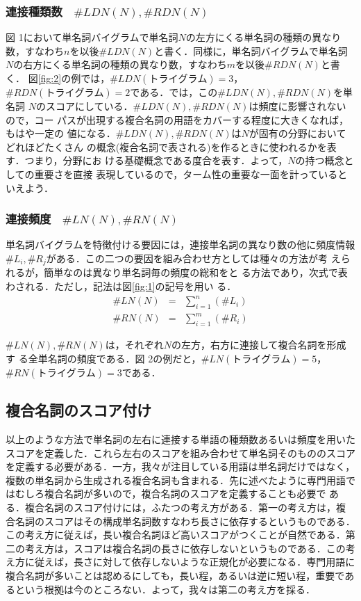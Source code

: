 \subsubsection {\bf 連接種類数　$\#LDN(N), \#RDN(N)$}
図 1において単名詞バイグラムで単名詞$N$の左方にくる単名詞の種類の異なり
数，すなわち$n$を以後$\#LDN(N)$と書く．同様に，単名詞バイグラムで単名詞
$N$の右方にくる単名詞の種類の異なり数，すなわち$m$を以後$\#RDN(N)$と書く．
図\ref{fig:2}の例では，$\#LDN(トライグラム)=3$，$\#RDN(トライグラム
)=2$である．\cite{NakagawaMori98}では，この$\#LDN(N), \#RDN(N)$を単名詞
$N$のスコアにしている．$\#LDN(N), \#RDN(N)$は頻度に影響されないので，コー
パスが出現する複合名詞の用語をカバーする程度に大きくなれば，もはや一定の
値になる．$\#LDN(N), \#RDN(N)$は$N$が固有の分野においてどれほどたくさん
の概念(複合名詞で表される)を作るときに使われるかを表す．つまり，分野にお
ける基礎概念である度合を表す．よって，$N$の持つ概念としての重要さを直接
表現しているので，ターム性の重要な一面を計っているといえよう．

\subsubsection {\bf 連接頻度　$\#LN(N), \#RN(N)$}
単名詞バイグラムを特徴付ける要因には，連接単名詞の異なり数の他に頻度情報
$\#L_i, \#R_j$がある．この二つの要因を組み合わせ方としては種々の方法が考
えられるが，簡単なのは異なり単名詞毎の頻度の総和をと
る方法であり，次式で表わされる．ただし，記法は図\ref{fig:1}の記号を用い
る．
\begin{eqnarray}
\#LN(N) & = & \sum_{i=1}^{n}(\#L_i) \label{form1}\\
\#RN(N) & = & \sum_{i=1}^{m}(\#R_i) \label{form2}
\end{eqnarray}

$\#LN(N), \#RN(N)$は，それぞれ$N$の左方，右方に連接して複合名詞を形成す
る全単名詞の頻度である．図 2の例だと，$\#LN(トライグラム)=5$，$\#RN(トラ
イグラム)=3$である．









\subsection{複合名詞のスコア付け}

以上のような方法で単名詞の左右に連接する単語の種類数あるいは頻度を用いた
スコアを定義した．これら左右のスコアを組み合わせて単名詞そのもののスコア
を定義する必要がある．一方，我々が注目している用語は単名詞だけではなく，
複数の単名詞から生成される複合名詞も含まれる．先に述べたように専門用語で
はむしろ複合名詞が多いので，複合名詞のスコアを定義することも必要で
ある．複合名詞のスコア付けには，ふたつの考え方がある．第一の考え方は，複
合名詞のスコアはその構成単名詞数すなわち長さに依存するというものである．
この考え方に従えば，長い複合名詞ほど高いスコアがつくことが自然である．第
二の考え方は，スコアは複合名詞の長さに依存しないというものである．この考
え方に従えば，長さに対して依存しないような正規化が必要になる．専門用語に
複合名詞が多いことは認めるにしても，長い程，あるいは逆に短い程，重要であ
るという根拠は今のところない．よって，我々は第二の考え方を採る．

